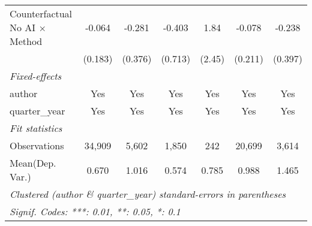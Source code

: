 \begin{tabular}{lcccccc}
   Counterfactual No AI $\times$ Method  & -0.064         & -0.281        & -0.403        & 1.84       & -0.078        & -0.238\\   
                                         & (0.183)        & (0.376)       & (0.713)       & (2.45)     & (0.211)       & (0.397)\\   
   \midrule
   \emph{Fixed-effects}\\
   author                                & Yes            & Yes           & Yes           & Yes        & Yes           & Yes\\  
   quarter\_year                         & Yes            & Yes           & Yes           & Yes        & Yes           & Yes\\  
   \midrule
   \emph{Fit statistics}\\
   Observations                          & 34,909         & 5,602         & 1,850         & 242        & 20,699        & 3,614\\  
Mean(Dep. Var.) & 0.670 & 1.016 & 0.574 & 0.785 & 0.988 & 1.465 \\
   \midrule \midrule
   \multicolumn{7}{l}{\emph{Clustered (author \& quarter\_year) standard-errors in parentheses}}\\
   \multicolumn{7}{l}{\emph{Signif. Codes: ***: 0.01, **: 0.05, *: 0.1}}\\
\end{tabular}
\par\endgroup
